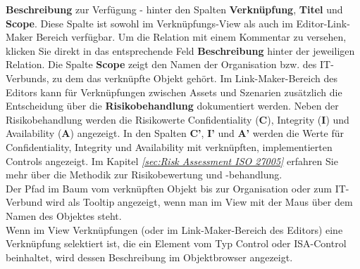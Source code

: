 \documentclass[a4paper,10pt]{book}
\begin{document}
\textbf{Beschreibung} zur Verfügung - hinter den Spalten \textbf{Verknüpfung}, \textbf{Titel} und \textbf{Scope}. Diese Spalte ist sowohl im Verknüpfungs-View
als auch im Editor-Link-Maker Bereich verfügbar. Um die Relation mit einem Kommentar zu versehen, klicken Sie direkt in das entsprechende Feld
\textbf{Beschreibung} hinter der jeweiligen Relation. Die Spalte \textbf{Scope} zeigt den Namen der Organisation bzw. des IT-Verbunds, zu dem das verknüpfte Objekt gehört.
Im Link-Maker-Bereich des Editors kann für Verknüpfungen zwischen Assets und Szenarien zusätzlich die Entscheidung über die \textbf{Risikobehandlung} dokumentiert werden.
Neben der Risikobehandlung werden die Risikowerte Confidentiality (\textbf{C}), Integrity (\textbf{I}) und Availability (\textbf{A}) angezeigt.
In den Spalten \textbf{C'}, \textbf{I'} und \textbf{A'} werden die Werte für Confidentiality, Integrity und Availability mit verknüpften, implementierten Controls angezeigt.
Im Kapitel {\em \ref{sec:Risk Assessment ISO 27005}  } erfahren Sie mehr über die Methodik zur Risikobewertung und -behandlung.
\newline\\
Der Pfad im Baum vom verknüpften Objekt bis zur Organisation oder zum IT-Verbund wird als Tooltip angezeigt, wenn man im View mit der Maus über dem Namen des Objektes steht.
\newline\\
Wenn im View Verknüpfungen (oder im Link-Maker-Bereich des Editors) eine Verknüpfung selektiert ist, die ein Element vom Typ Control oder ISA-Control beinhaltet, wird
dessen Beschreibung im Objektbrowser angezeigt.
\end{document}
